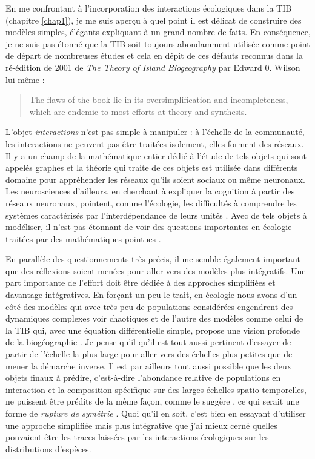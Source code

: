En me confrontant à l'incorporation des interactions écologiques dans la
TIB (chapitre \ref{chap1}), je me suis aperçu à quel point il est
délicat de construire des modèles simples, élégants expliquant à un
grand nombre de faits. En conséquence, je ne suis pas étonné que la TIB
soit toujours abondamment utilisée comme point de départ de nombreuses
études \citep{Warren2015} et cela en dépit de ces défauts reconnus dans
la ré-édition de 2001 de \emph{The Theory of Island Biogeography} par
Edward 0. Wilson lui même :

\begin{quote}
The flaws of the book lie in its oversimplification and incompleteness,
which are endemic to most efforts at theory and synthesis.
\end{quote}

L'objet \emph{interactions} n'est pas simple à manipuler : à l'échelle
de la communauté, les interactions ne peuvent pas être traitées
isolement, elles forment des réseaux. Il y a un champ de la mathématique
entier dédié à l'étude de tels objets qui sont appelés graphes et la
théorie qui traite de ces objets est utilisée dans différents domaine
pour appréhender les réseaux qu'ils soient sociaux ou même neuronaux.
Les neurosciences d'ailleurs, en cherchant à expliquer la cognition à
partir des réseaux neuronaux, pointent, comme l'écologie, les
difficultés à comprendre les systèmes caractérisés par l'interdépendance
de leurs unités \citep{Park2013}. Avec de tels objets à modéliser, il
n'est pas étonnant de voir des questions importantes en écologie
traitées par des mathématiques pointues \citep{Allesina2012a, Rohr2014}.

En parallèle des questionnements très précis, il me semble également
important que des réflexions soient menées pour aller vers des modèles
plus intégratifs. Une part importante de l'effort doit être dédiée à des
approches simplifiées et davantage intégratives. En forçant un peu le
trait, en écologie nous avons d'un côté des modèles qui avec très peu de
populations considérées engendrent des dynamiques complexes voir
chaotiques \citep[dont l'existence est validée
expérimentalement][]{Costantino1997b, Fussmann2000} et de l'autre des
modèles comme celui de la TIB qui, avec une équation différentielle
simple, propose une vision profonde de la biogéographie
\citep{MacArthur1967}. Je pense qu'il qu'il est tout aussi pertinent
d'essayer de partir de l'échelle la plus large pour aller vers des
échelles plus petites que de mener la démarche inverse. Il est par
ailleurs tout aussi possible que les deux objets finaux à prédire,
c'est-à-dire l'abondance relative de populations en interaction et la
composition spécifique sur des larges échelles spatio-temporelles, ne
puissent être prédits de la même façon, comme le suggère
\citet{Lawton1999}, ce qui serait une forme de \emph{rupture de
symétrie} \citep[au sens de][]{Anderson1972}. Quoi qu'il en soit, c'est
bien en essayant d'utiliser une approche simplifiée mais plus
intégrative que j'ai mieux cerné quelles pouvaient être les traces
laissées par les interactions écologiques sur les distributions
d'espèces.

